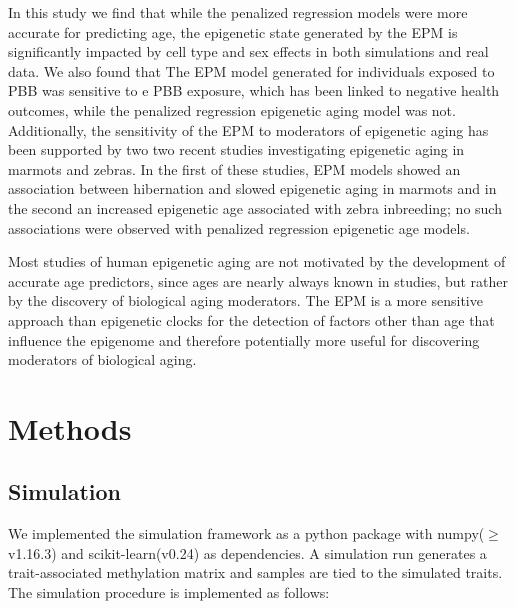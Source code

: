 \documentclass{article}
\begin{document}
{\begin{linenumbers}
In this study we find that while the penalized regression models were more accurate for predicting age, the epigenetic 
state generated by the EPM is significantly impacted by  cell type and sex effects in both simulations and real data. 
We also found that The EPM model generated for individuals exposed to PBB was sensitive to e PBB exposure, which has 
been linked to negative health outcomes, while the penalized regression epigenetic aging model was not. Additionally, 
the sensitivity of the EPM to moderators of epigenetic aging has been supported by two two recent studies  
investigating epigenetic aging in marmots\cite{Pinho2021-gm} and zebras\cite{Larison2021-ts}. In the first of 
these studies, EPM models showed an association between hibernation and slowed epigenetic aging in marmots and 
in the second an increased epigenetic age associated with zebra inbreeding; no such associations were observed with 
penalized regression epigenetic age models. 

Most studies of human epigenetic aging are not motivated by the development of accurate age predictors, since ages 
are nearly always known in studies,  but rather by the discovery of  biological aging moderators. The EPM is a more 
sensitive approach than epigenetic clocks for the detection of factors other than age that influence the epigenome  
and therefore potentially more useful for discovering moderators of biological aging. 

\section{Methods}

\subsection{Simulation}

We implemented the simulation framework as a python package with numpy($\geq$v1.16.3)\cite{Harris2020-yb} and 
scikit-learn(v0.24)\cite{Pedregosa2011-fi} as dependencies. A simulation run generates  a trait-associated methylation
matrix and samples are tied to the simulated  traits. The simulation procedure is implemented as follows:
\begin{itemize}


\end{itemize}
\end{linenumbers}}
\end{document}

